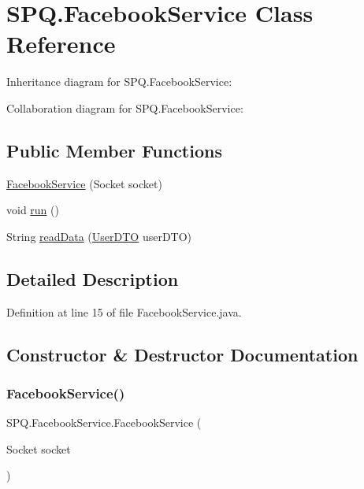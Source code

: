 \hypertarget{class_s_p_q_1_1_facebook_service}{}\section{S\+P\+Q.\+Facebook\+Service Class Reference}
\label{class_s_p_q_1_1_facebook_service}


Inheritance diagram for S\+P\+Q.\+Facebook\+Service\+:


Collaboration diagram for S\+P\+Q.\+Facebook\+Service\+:
\subsection*{Public Member Functions}
\begin{DoxyCompactItemize}
\item 
\mbox{\hyperlink{class_s_p_q_1_1_facebook_service_a87c0122d98acc55bde0e958f59916887}{Facebook\+Service}} (Socket socket)
\item 
void \mbox{\hyperlink{class_s_p_q_1_1_facebook_service_a24a62bc6a32966419548314bc417abfb}{run}} ()
\item 
String \mbox{\hyperlink{class_s_p_q_1_1_facebook_service_a087e3aab2d870149c0ef74f3adf75efa}{read\+Data}} (\mbox{\hyperlink{class_s_p_q_1_1dto_1_1_user_d_t_o}{User\+D\+TO}} user\+D\+TO)
\end{DoxyCompactItemize}


\subsection{Detailed Description}


Definition at line 15 of file Facebook\+Service.\+java.



\subsection{Constructor \& Destructor Documentation}
\mbox{\label{class_s_p_q_1_1_facebook_service_a87c0122d98acc55bde0e958f59916887}} 
\subsubsection{\texorpdfstring{Facebook\+Service()}{FacebookService()}}
{\footnotesize\ttfamily S\+P\+Q.\+Facebook\+Service.\+Facebook\+Service (\begin{DoxyParamCaption}\item[{Socket}]{socket }\end{DoxyParamCaption})}



